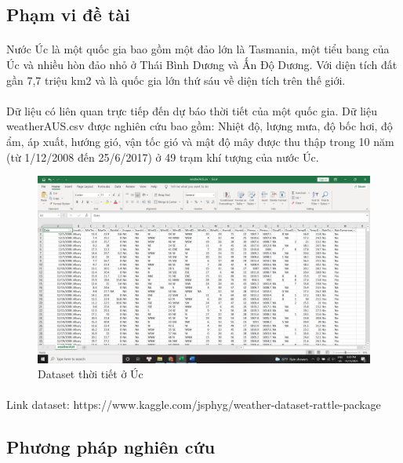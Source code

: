 \documentclass{article}
\begin{document}
\subsection{Phạm vi đề tài}
\paragraph{}
Nước Úc là một quốc gia bao gồm một đảo lớn là Tasmania, một tiểu bang của Úc và nhiều hòn đảo nhỏ ở Thái Bình Dương và Ấn Độ Dương. Với diện tích đất gần 7,7 triệu km2 và là quốc gia lớn thứ sáu về diện tích trên thế giới.
\paragraph{}
	Dữ liệu có liên quan trực tiếp đến dự báo thời tiết của một quốc gia. Dữ liệu weatherAUS.csv được nghiên cứu bao gồm: Nhiệt độ, lượng mưa, độ bốc hơi, độ ẩm, áp xuất, hướng gió, vận tốc gió và mật độ mây được thu thập trong 10 năm (từ 1/12/2008 đến 25/6/2017) ở 49 trạm khí tượng của nước Úc.
    \begin{figure}[!h]
	\begin{center}
		\includegraphics[width=\linewidth]{images/dataset.png}
		\caption{\fontsize{14}{20}\selectfont Dataset thời tiết ở Úc}      
	\end{center}
\end{figure}
\paragraph{}
    Link dataset: https://www.kaggle.com/jsphyg/weather-dataset-rattle-package

\subsection{Phương pháp nghiên cứu}
\end{document}
